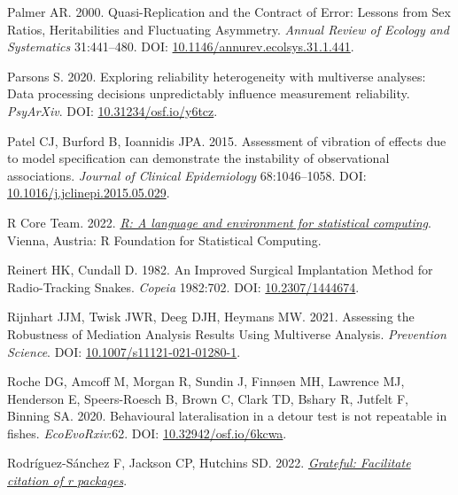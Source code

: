 \documentclass[10pt,a4paper]{article}
\newlength{\cslhangindent}
\newlength{\cslentryspacingunit} %
\newenvironment{CSLReferences}[2] %
 {%
  \setlength{\parindent}{0pt}
  \ifodd #1
  \let\oldpar\par
  \def\par{\hangindent=\cslhangindent\oldpar}
  \fi
  \setlength{\parskip}{#2\cslentryspacingunit}
 }%
 {}
\begin{document}
\begin{CSLReferences}{1}{0}
\leavevmode{}%
Palmer AR. 2000. Quasi-{Replication} and the {Contract} of {Error}: {Lessons} from {Sex} {Ratios}, {Heritabilities} and {Fluctuating} {Asymmetry}. \emph{Annual Review of Ecology and Systematics} 31:441--480. DOI: \href{https://doi.org/10.1146/annurev.ecolsys.31.1.441}{10.1146/annurev.ecolsys.31.1.441}.

\leavevmode{}%
Parsons S. 2020. Exploring reliability heterogeneity with multiverse analyses: {Data} processing decisions unpredictably influence measurement reliability. \emph{PsyArXiv}. DOI: \href{https://doi.org/10.31234/osf.io/y6tcz}{10.31234/osf.io/y6tcz}.

\leavevmode{}%
Patel CJ, Burford B, Ioannidis JPA. 2015. Assessment of vibration of effects due to model specification can demonstrate the instability of observational associations. \emph{Journal of Clinical Epidemiology} 68:1046--1058. DOI: \href{https://doi.org/10.1016/j.jclinepi.2015.05.029}{10.1016/j.jclinepi.2015.05.029}.

\leavevmode{}%
R Core Team. 2022. \emph{\href{https://www.R-project.org/}{R: A language and environment for statistical computing}}. Vienna, Austria: R Foundation for Statistical Computing.

\leavevmode{}%
Reinert HK, Cundall D. 1982. An {Improved} {Surgical} {Implantation} {Method} for {Radio}-{Tracking} {Snakes}. \emph{Copeia} 1982:702. DOI: \href{https://doi.org/10.2307/1444674}{10.2307/1444674}.

\leavevmode{}%
Rijnhart JJM, Twisk JWR, Deeg DJH, Heymans MW. 2021. Assessing the {Robustness} of {Mediation} {Analysis} {Results} {Using} {Multiverse} {Analysis}. \emph{Prevention Science}. DOI: \href{https://doi.org/10.1007/s11121-021-01280-1}{10.1007/s11121-021-01280-1}.

\leavevmode{}%
Roche DG, Amcoff M, Morgan R, Sundin J, Finnøen MH, Lawrence MJ, Henderson E, Speers-Roesch B, Brown C, Clark TD, Bshary R, Jutfelt F, Binning SA. 2020. Behavioural lateralisation in a detour test is not repeatable in fishes. \emph{EcoEvoRxiv}:62. DOI: \href{https://doi.org/10.32942/osf.io/6kcwa}{10.32942/osf.io/6kcwa}.

\leavevmode{}%
Rodríguez-Sánchez F, Jackson CP, Hutchins SD. 2022. \emph{\href{https://github.com/Pakillo/grateful}{Grateful: Facilitate citation of r packages}}.


\end{CSLReferences}
\end{document}
